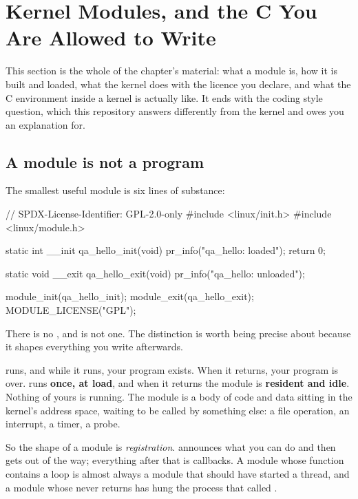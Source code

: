 
\section{Kernel Modules, and the C You Are Allowed to Write}
\label{c4:app:a}

This section is the whole of the chapter's material: what a module is, how it is built and loaded,
what the kernel does with the licence you declare, and what the C environment inside a kernel is
actually like. It ends with the coding style question, which this repository answers differently
from the kernel and owes you an explanation for.

\subsection{A module is not a program}
\label{c4:app:a1}

The smallest useful module is six lines of substance:

\begin{ccode}
// SPDX-License-Identifier: GPL-2.0-only
#include <linux/init.h>
#include <linux/module.h>

static int __init qa_hello_init(void)
{
    pr_info("qa_hello: loaded\n");
    return 0;
}

static void __exit qa_hello_exit(void)
{
    pr_info("qa_hello: unloaded\n");
}

module_init(qa_hello_init);
module_exit(qa_hello_exit);
MODULE_LICENSE("GPL");
\end{ccode}

\noindent There is no , and  is not one. The distinction is worth
being precise about because it shapes everything you write afterwards.

 runs, and while it runs, your program exists. When it returns, your program is over.
 runs \textbf{once, at load}, and when it returns the module is \textbf{resident
and idle}. Nothing of yours is running. The module is a body of code and data sitting in the
kernel's address space, waiting to be called by something else: a file operation, an interrupt, a
timer, a probe.

So the shape of a module is \emph{registration}.  announces what you can do and then gets
out of the way; everything after that is callbacks. A module whose  function contains a
loop is almost always a module that should have started a thread, and a module whose 
never returns has hung the process that called .

